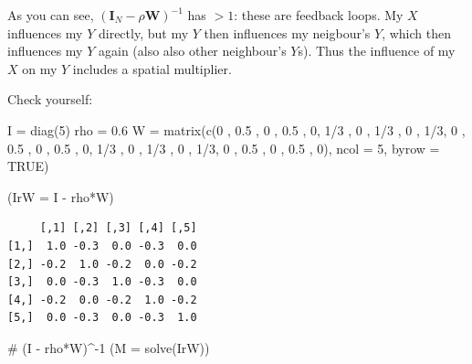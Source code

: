 \documentclass[
  letterpaper,
  DIV=11,
  numbers=noendperiod]{scrreprt}
\newenvironment{Shaded}{\begin{snugshade}}{\end{snugshade}}
\newcommand{\AttributeTok}[1]{\textcolor[rgb]{0.40,0.45,0.13}{#1}}
\newcommand{\CommentTok}[1]{\textcolor[rgb]{0.37,0.37,0.37}{#1}}
\newcommand{\ConstantTok}[1]{\textcolor[rgb]{0.56,0.35,0.01}{#1}}
\newcommand{\DecValTok}[1]{\textcolor[rgb]{0.68,0.00,0.00}{#1}}
\newcommand{\FloatTok}[1]{\textcolor[rgb]{0.68,0.00,0.00}{#1}}
\newcommand{\FunctionTok}[1]{\textcolor[rgb]{0.28,0.35,0.67}{#1}}
\newcommand{\NormalTok}[1]{\textcolor[rgb]{0.00,0.23,0.31}{#1}}
\newcommand{\OtherTok}[1]{\textcolor[rgb]{0.00,0.23,0.31}{#1}}
\newcommand{\SpecialCharTok}[1]{\textcolor[rgb]{0.37,0.37,0.37}{#1}}
\begin{document}
As you can see,
\((\boldsymbol{\mathbf{I}}_N - \rho \boldsymbol{\mathbf{W}})^{-1}\) has
\color{red}{diagonal elements} \(>1\): these are feedback loops. My
\(X\) influences my \(Y\) directly, but my \(Y\) then influences my
neigbour's \(Y\), which then influences my \(Y\) again (also also other
neighbour's \(Y\)s). Thus the influence of my \(X\) on my \(Y\) includes
a spatial multiplier.

Check yourself:

\begin{Shaded}
\begin{Highlighting}[]
\NormalTok{I }\OtherTok{=} \FunctionTok{diag}\NormalTok{(}\DecValTok{5}\NormalTok{)}
\NormalTok{rho }\OtherTok{=} \FloatTok{0.6}
\NormalTok{W }\OtherTok{=} \FunctionTok{matrix}\NormalTok{(}\FunctionTok{c}\NormalTok{(}\DecValTok{0}\NormalTok{ , }\FloatTok{0.5}\NormalTok{ , }\DecValTok{0}\NormalTok{ , }\FloatTok{0.5}\NormalTok{ , }\DecValTok{0}\NormalTok{,}
            \DecValTok{1}\SpecialCharTok{/}\DecValTok{3}\NormalTok{ , }\DecValTok{0}\NormalTok{ , }\DecValTok{1}\SpecialCharTok{/}\DecValTok{3}\NormalTok{ , }\DecValTok{0}\NormalTok{ , }\DecValTok{1}\SpecialCharTok{/}\DecValTok{3}\NormalTok{,}
            \DecValTok{0}\NormalTok{ , }\FloatTok{0.5}\NormalTok{ , }\DecValTok{0}\NormalTok{ , }\FloatTok{0.5}\NormalTok{ , }\DecValTok{0}\NormalTok{,}
            \DecValTok{1}\SpecialCharTok{/}\DecValTok{3}\NormalTok{ , }\DecValTok{0}\NormalTok{ , }\DecValTok{1}\SpecialCharTok{/}\DecValTok{3}\NormalTok{ , }\DecValTok{0}\NormalTok{ , }\DecValTok{1}\SpecialCharTok{/}\DecValTok{3}\NormalTok{,}
            \DecValTok{0}\NormalTok{ , }\FloatTok{0.5}\NormalTok{ , }\DecValTok{0}\NormalTok{ , }\FloatTok{0.5}\NormalTok{ , }\DecValTok{0}\NormalTok{), }\AttributeTok{ncol =} \DecValTok{5}\NormalTok{, }\AttributeTok{byrow =} \ConstantTok{TRUE}\NormalTok{)}

\NormalTok{(}\AttributeTok{IrW =}\NormalTok{ I }\SpecialCharTok{{-}}\NormalTok{ rho}\SpecialCharTok{*}\NormalTok{W)}
\end{Highlighting}
\end{Shaded}

\begin{verbatim}
     [,1] [,2] [,3] [,4] [,5]
[1,]  1.0 -0.3  0.0 -0.3  0.0
[2,] -0.2  1.0 -0.2  0.0 -0.2
[3,]  0.0 -0.3  1.0 -0.3  0.0
[4,] -0.2  0.0 -0.2  1.0 -0.2
[5,]  0.0 -0.3  0.0 -0.3  1.0
\end{verbatim}

\begin{Shaded}
\begin{Highlighting}[]
\CommentTok{\# (I {-} rho*W)\^{}{-}1}
\NormalTok{(}\AttributeTok{M =} \FunctionTok{solve}\NormalTok{(IrW))}
\end{Highlighting}
\end{Shaded}
\end{document}
